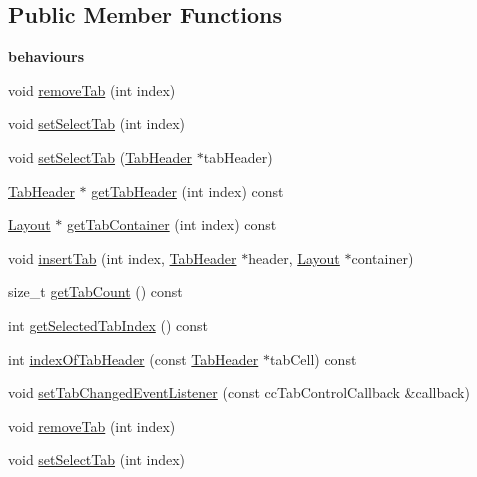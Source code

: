 \subsection*{Public Member Functions}
\begin{Indent}\textbf{ behaviours}\par
\begin{DoxyCompactItemize}
\item 
void \hyperlink{classui_1_1TabControl_a57d2ed03c45a39c9bb706da085f82ba0}{remove\+Tab} (int index)
\item 
void \hyperlink{classui_1_1TabControl_a1ac499ffee1045aabfb885b0ed873174}{set\+Select\+Tab} (int index)
\item 
void \hyperlink{classui_1_1TabControl_a4312f6e1d6c73d858fc662443b623e93}{set\+Select\+Tab} (\hyperlink{classui_1_1TabHeader}{Tab\+Header} $\ast$tab\+Header)
\item 
\hyperlink{classui_1_1TabHeader}{Tab\+Header} $\ast$ \hyperlink{classui_1_1TabControl_ae3313d78b4e18c07b4e77517a2bed36c}{get\+Tab\+Header} (int index) const
\item 
\hyperlink{classui_1_1Layout}{Layout} $\ast$ \hyperlink{classui_1_1TabControl_a08df77bcf0df42001144f4a77f1291cd}{get\+Tab\+Container} (int index) const
\item 
void \hyperlink{classui_1_1TabControl_a12d623c4549b6175cdeb1db13d4dfedf}{insert\+Tab} (int index, \hyperlink{classui_1_1TabHeader}{Tab\+Header} $\ast$header, \hyperlink{classui_1_1Layout}{Layout} $\ast$container)
\item 
size\+\_\+t \hyperlink{classui_1_1TabControl_a85ad9aa8633df37bd11b99ecce6ad8ee}{get\+Tab\+Count} () const
\item 
int \hyperlink{classui_1_1TabControl_ac446282790475b8afcfe3e5b81afac2a}{get\+Selected\+Tab\+Index} () const
\item 
int \hyperlink{classui_1_1TabControl_a4783116cb27769670ed4c4eff9c0985b}{index\+Of\+Tab\+Header} (const \hyperlink{classui_1_1TabHeader}{Tab\+Header} $\ast$tab\+Cell) const
\item 
void \hyperlink{classui_1_1TabControl_a16fecfa3c0550e2afcfe9280aa633ada}{set\+Tab\+Changed\+Event\+Listener} (const cc\+Tab\+Control\+Callback \&callback)
\item 
void \hyperlink{classui_1_1TabControl_a57d2ed03c45a39c9bb706da085f82ba0}{remove\+Tab} (int index)
\item 
void \hyperlink{classui_1_1TabControl_a1ac499ffee1045aabfb885b0ed873174}{set\+Select\+Tab} (int index)
\item 

\end{DoxyCompactItemize}
\end{Indent}
